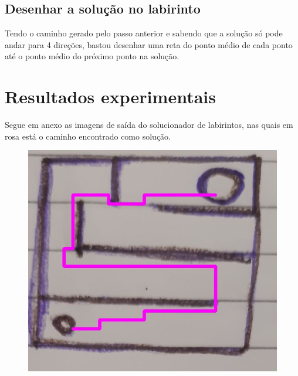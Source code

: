 \documentclass[conference]{IEEEtran}
\begin{document}
\subsection{Desenhar a solução no labirinto}
Tendo o caminho gerado pelo passo anterior e sabendo que a solução só pode andar para 4 direções, bastou desenhar uma reta do ponto médio de cada ponto até o ponto médio do próximo ponto na solução.

\section*{Resultados experimentais}
Segue em anexo as imagens de saída do solucionador de labirintos, nas quais em rosa está o caminho encontrado como solução.
\begin{figure}[h!]
   \centering
    {\includegraphics[scale=0.25]{solutioneasy.jpg}}
\end{figure}
\end{document}
